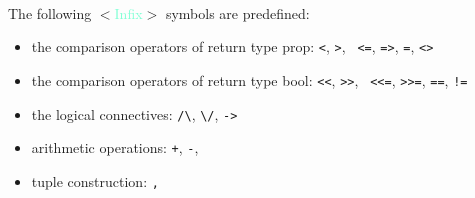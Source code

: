 \documentclass[a4paper]{scrreprt}
\newcommand{\likecat}[1]{$<$\textcolor{Aquamarine}{#1}$>$}
\newcommand{\catdef}[1]{\label{#1}\likecat{#1}}
\begin{document}
\paragraph{}
The following \catdef{Infix} symbols are predefined:
  \begin{itemize}
  \item the comparison operators of return type prop: {\tt <}, {\tt >}, {\tt
  <=}, {\tt =>}, {\tt =}, {\tt <>}
  \item the comparison operators of return type bool: {\tt <<}, {\tt >>}, {\tt
  <<=}, {\tt >>=}, {\tt ==}, {\tt !=}
  \item the logical connectives: \verb|/\|, \verb|\/|, {\tt ->}
  \item arithmetic operations: {\tt +}, {\tt -}, {\tt *}
  \item tuple construction: {\tt ,}
  \end{itemize}
\end{document}

